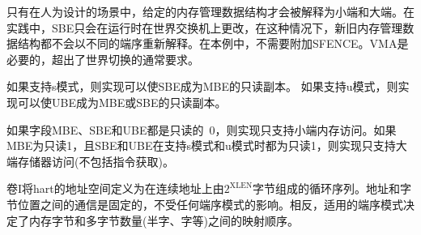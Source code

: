 \begin{commentary}
只有在人为设计的场景中，给定的内存管理数据结构才会被解释为小端和大端。在实践中，SBE只会在运行时在世界交换机上更改，在这种情况下，新旧内存管理数据结构都不会以不同的端序重新解释。在本例中，不需要附加SFENCE。VMA是必要的，超出了世界切换的通常要求。
\end{commentary}

\iffalse
If S-mode is supported, an implementation may make SBE be a read-only
copy of MBE.
If U-mode is supported, an implementation may make UBE be a read-only
copy of either MBE or SBE.
\fi

如果支持s模式，则实现可以使SBE成为MBE的只读副本。
如果支持u模式，则实现可以使UBE成为MBE或SBE的只读副本。

\iffalse
\begin{commentary}
An implementation supports only little-endian memory accesses if fields
MBE, SBE, and UBE are all read-only~0.
An implementation supports only big-endian memory accesses (aside from
instruction fetches) if MBE is read-only 1 and SBE and UBE are each
read-only 1 when S-mode and U-mode are supported.
\end{commentary}
\fi

\begin{commentary}
如果字段MBE、SBE和UBE都是只读的~0，则实现只支持小端内存访问。如果MBE为只读1，且SBE和UBE在支持s模式和u模式时都为只读1，则实现只支持大端存储器访问(不包括指令获取)。
\end{commentary}

\iffalse
\begin{commentary}
Volume I defines a hart's address space as a circular sequence of
$2^{\text{XLEN}}$ bytes at consecutive addresses.
The correspondence between addresses and byte locations is fixed and not
affected by any endianness mode.
Rather, the applicable endianness mode determines the order of mapping
between memory bytes and a multibyte quantity (halfword, word, etc.).
\end{commentary}
\fi

\begin{commentary}
卷I将hart的地址空间定义为在连续地址上由$2^{\text{XLEN}}$字节组成的循环序列。地址和字节位置之间的通信是固定的，不受任何端序模式的影响。相反，适用的端序模式决定了内存字节和多字节数量(半字、字等)之间的映射顺序。
\end{commentary}

\iffalse
\begin{commentary}
Standard RISC-V ABIs are expected to be purely little-endian-only or
big-endian-only, with no accommodation for mixing endianness.
Nevertheless, endianness control has been defined so as to permit, for
instance, an OS of one endianness to execute user-mode programs of the
opposite endianness.
Consideration has been given also to the possibility of nonstandard
usages whereby software flips the endianness of memory accesses as
needed.
\end{commentary}
\fi

